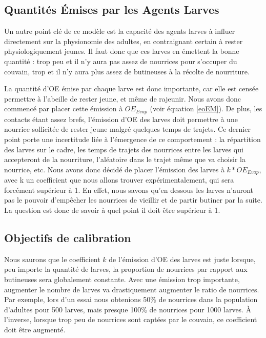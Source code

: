 	
	
	\subsection{Quantités Émises par les Agents Larves}
	\label{subsesctionPHLarves}
	Un autre point clé de ce modèle est la capacité des agents larves à influer directement sur la physionomie des adultes, en contraignant certain à rester physiologiquement jeunes. Il faut donc que ces larves en émettent la bonne quantité : trop peu et il n'y aura pas assez de nourrices pour s'occuper du couvain, trop et il n'y aura plus assez de butineuses à la récolte de nourriture.
	
	La quantité d'OE émise par chaque larve est donc importante, car elle est censée permettre à l'abeille de rester jeune, et même de rajeunir. Nous avons donc commencé par placer cette émission à $OE_{Evap}$ (voir équation \ref{eoEM}). De plus, les contacts étant assez brefs, l'émission d'OE des larves doit permettre à une nourrice sollicitée de rester jeune malgré quelques temps de trajets. Ce dernier point porte une incertitude liée à l'émergence de ce comportement : la répartition des larves sur le cadre, les temps de trajets des nourrices entre les larves qui accepteront de la nourriture, l'aléatoire dans le trajet même que va choisir la nourrice, etc. Nous avons donc décidé de placer l'émission des larves à $k * OE_{Evap}$, avec k un coefficient que nous allons trouver expérimentalement, qui sera forcément supérieur à 1. En effet, nous savons qu'en dessous les larves n'auront pas le pouvoir d'empêcher les nourrices de vieillir et de partir butiner par la suite. La question est donc de savoir à quel point il doit être supérieur à 1.
	
	\subsection{Objectifs de calibration}
	\label{subsectionObjectifCalibration}
	Nous saurons que le coefficient $k$ de l'émission d'OE des larves est juste lorsque, peu importe la quantité de larves, la proportion de nourrices par rapport aux butineuses sera globalement constante. Avec une émission trop importante, augmenter le nombre de larves va drastiquement augmenter le ratio de nourrices. Par exemple, lors d'un essai nous obtenions 50\% de nourrices dans la population d'adultes pour 500 larves, mais presque 100\% de nourrices pour 1000 larves. À l'inverse, lorsque trop peu de nourrices sont captées par le couvain, ce coefficient doit être augmenté.
	
